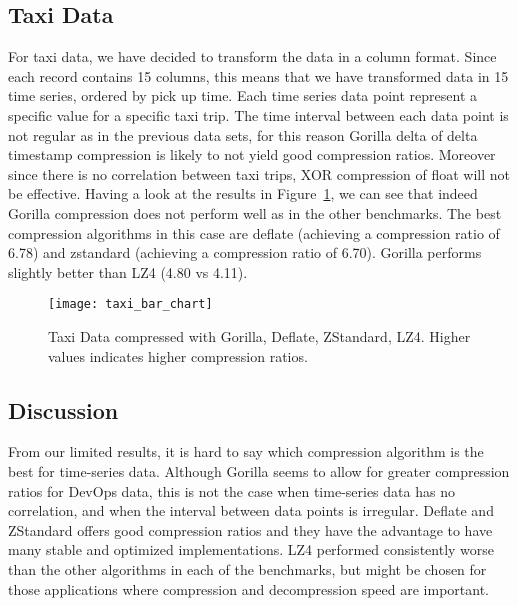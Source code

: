 \subsection{Taxi Data}
For taxi data, we have decided to transform the data in a column format.
Since each record contains 15 columns, this means that we have transformed data in 15 time series,
ordered by pick up time.
Each time series data point represent a specific value for a specific taxi trip.
The time interval between each data point is not regular as in the previous data sets, for this
reason Gorilla delta of delta timestamp compression is likely to not yield good compression
ratios. Moreover since there is no correlation between taxi trips, XOR compression of float will
not be effective.
Having a look at the results in Figure~\ref{taxi_bar_chart}, we can see that indeed Gorilla compression does not perform well as
in the other benchmarks. The best compression algorithms in this case are deflate (achieving a compression
ratio of 6.78) and zstandard (achieving a compression ratio of 6.70). Gorilla performs slightly
better than LZ4 (4.80 vs 4.11).

\begin{figure}[!htbp]
\begin{center}
\texttt{[image: taxi\_bar\_chart]}
\caption[compression]{Taxi Data compressed with Gorilla, Deflate, ZStandard, LZ4.
Higher values indicates higher compression ratios.}
\label{taxi_bar_chart}
\end{center}
\end{figure}

\subsection{Discussion}
From our limited results, it is hard to say which compression algorithm is the best for time-series data.
Although Gorilla seems to allow for greater compression ratios for DevOps data, this is not the case when
time-series data has no correlation, and when the interval between data points is irregular.
Deflate and ZStandard offers good compression ratios and they have the advantage to have many stable and
optimized implementations.
LZ4 performed consistently worse than the other algorithms in each of the benchmarks, but might be chosen
for those applications where compression and decompression speed are important.

